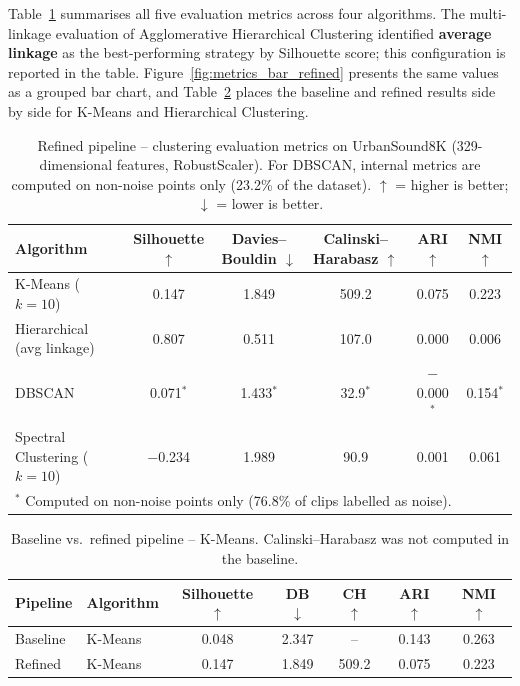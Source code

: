 \documentclass[runningheads,a4paper,11pt]{report}
\begin{document}
Table~\ref{tab:metrics_refined} summarises all five evaluation metrics across four algorithms. The multi-linkage evaluation of Agglomerative Hierarchical Clustering identified \textbf{average linkage} as the best-performing strategy by Silhouette score; this configuration is reported in the table. Figure~\ref{fig:metrics_bar_refined} presents the same values as a grouped bar chart, and Table~\ref{tab:comparison} places the baseline and refined results side by side for K-Means and Hierarchical Clustering.

\begin{table}[htbp]
    \centering
    \small %
    \caption{Refined pipeline -- clustering evaluation metrics on UrbanSound8K (329-dimensional features, RobustScaler). For DBSCAN, internal metrics are computed on non-noise points only (23.2\% of the dataset). $\uparrow$ = higher is better; $\downarrow$ = lower is better.}
    \label{tab:metrics_refined}
    \begin{tabular}{lccccc}
        \hline
        \textbf{Algorithm} & \textbf{Silhouette} $\uparrow$ & \textbf{Davies--Bouldin} $\downarrow$ & \textbf{Calinski--Harabasz} $\uparrow$ & \textbf{ARI} $\uparrow$ & \textbf{NMI} $\uparrow$ \\
        \hline
        K-Means ($k=10$)                    & 0.147  & 1.849  & 509.2   & 0.075  & 0.223  \\
        Hierarchical (avg linkage)      & 0.807  & 0.511  & 107.0   & 0.000  & 0.006  \\
        DBSCAN                              & 0.071$^*$ & 1.433$^*$ & 32.9$^*$ & $-$0.000$^*$ & 0.154$^*$ \\
        Spectral Clustering ($k=10$)        & $-$0.234 & 1.989 & 90.9   & 0.001  & 0.061  \\
        \hline
        \multicolumn{6}{l}{\footnotesize $^*$ Computed on non-noise points only (76.8\% of clips labelled as noise).}
    \end{tabular}
\end{table}

\begin{table}[htbp]
    \centering
    \caption{Baseline vs.\ refined pipeline -- K-Means. Calinski--Harabasz was not computed in the baseline.}
    \label{tab:comparison}
    \begin{tabular}{llccccc}
        \hline
        \textbf{Pipeline} & \textbf{Algorithm} & \textbf{Silhouette} $\uparrow$ & \textbf{DB} $\downarrow$ & \textbf{CH} $\uparrow$ & \textbf{ARI} $\uparrow$ & \textbf{NMI} $\uparrow$ \\
        \hline
        Baseline & K-Means         & 0.048 & 2.347 & --    & 0.143 & 0.263 \\
        Refined  & K-Means         & 0.147 & 1.849 & 509.2 & 0.075 & 0.223 \\
        \hline
    \end{tabular}
\end{table}
\end{document}
